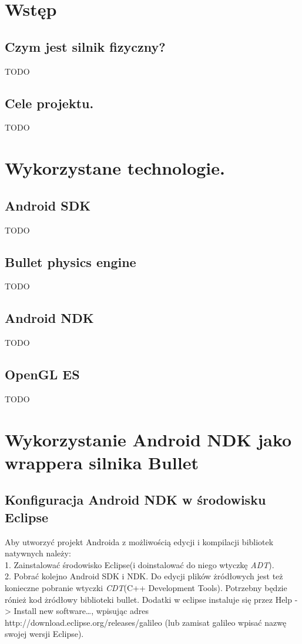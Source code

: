   \section{Wstęp}\label{sec:wstep}
  \subsection{Czym jest silnik fizyczny?}\label{subsec:czymJestSilnik}
TODO
  \subsection{Cele projektu.}\label{subsec:celeProjektu}
TODO
  \newpage
  \section{Wykorzystane technologie.}
  \subsection{Android SDK}
TODO
  \subsection{Bullet physics engine}
TODO
  \subsection{Android NDK}
TODO
\subsection{OpenGL ES}
TODO
  \newpage
  \section{Wykorzystanie Android NDK jako wrappera silnika Bullet}
  \subsection{Konfiguracja Android NDK w środowisku Eclipse}
  Aby utworzyć projekt Androida z możliwością edycji i kompilacji bibliotek
  natywnych należy: \\
  1. Zainstalować środowisko Eclipse(i doinstalować do niego wtyczkę
  \emph{ADT}).\\
  2. Pobrać kolejno Android SDK i NDK. Do edycji plików żródłowych jest
  też konieczne pobranie wtyczki \emph{CDT}(C++ Development Tools). Potrzebny
  będzie rónież kod żródłowy biblioteki bullet. Dodatki w eclipse instaluje się przez
  Help -> Install new software\ldots , wpisując adres http://download.eclipse.org/releases/galileo (lub zamisat
  galileo wpisać nazwę swojej wersji Eclipse).
  

